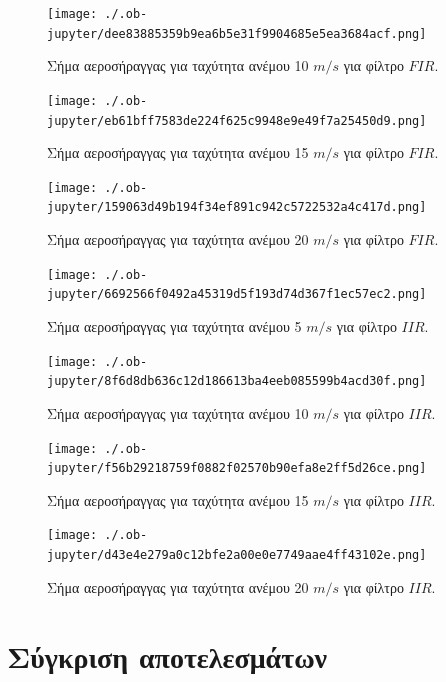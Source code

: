 \documentclass[breaklines=true, 12pt]{article}
\begin{document}
{{{\begin{figure}[htbp]
\centering
\texttt{[image: ./.ob-jupyter/dee83885359b9ea6b5e31f9904685e5ea3684acf.png]}
\caption{\label{fi1_10}Σήμα αεροσήραγγας για ταχύτητα ανέμου 10 \(m/s\) για φίλτρο \(FIR\).}
\end{figure}

\begin{figure}[htbp]
\centering
\texttt{[image: ./.ob-jupyter/eb61bff7583de224f625c9948e9e49f7a25450d9.png]}
\caption{\label{fi1_15}Σήμα αεροσήραγγας για ταχύτητα ανέμου 15 \(m/s\) για φίλτρο \(FIR\).}
\end{figure}

\begin{figure}[htbp]
\centering
\texttt{[image: ./.ob-jupyter/159063d49b194f34ef891c942c5722532a4c417d.png]}
\caption{\label{fi1_w20}Σήμα αεροσήραγγας για ταχύτητα ανέμου 20 \(m/s\) για φίλτρο \(FIR\).}
\end{figure}

\begin{figure}[htbp]
\centering
\texttt{[image: ./.ob-jupyter/6692566f0492a45319d5f193d74d367f1ec57ec2.png]}
\caption{\label{ii1_w5}Σήμα αεροσήραγγας για ταχύτητα ανέμου 5 \(m/s\) για φίλτρο \(IIR\).}
\end{figure}

\begin{figure}[htbp]
\centering
\texttt{[image: ./.ob-jupyter/8f6d8db636c12d186613ba4eeb085599b4acd30f.png]}
\caption{\label{ii1_w10}Σήμα αεροσήραγγας για ταχύτητα ανέμου 10 \(m/s\) για φίλτρο \(IIR\).}
\end{figure}

\begin{figure}[htbp]
\centering
\texttt{[image: ./.ob-jupyter/f56b29218759f0882f02570b90efa8e2ff5d26ce.png]}
\caption{\label{ii1_w15}Σήμα αεροσήραγγας για ταχύτητα ανέμου 15 \(m/s\) για φίλτρο \(IIR\).}
\end{figure}

\begin{figure}[htbp]
\centering
\texttt{[image: ./.ob-jupyter/d43e4e279a0c12bfe2a00e0e7749aae4ff43102e.png]}
\caption{\label{ii1_w20}Σήμα αεροσήραγγας για ταχύτητα ανέμου 20 \(m/s\) για φίλτρο \(IIR\).}
\end{figure}
\clearpage
\section{Σύγκριση αποτελεσμάτων}
\label{sec:org2ec1707}
}}}
\end{document}

